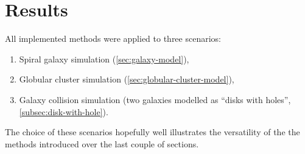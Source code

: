 \chapter{Results}
All implemented methods were applied to three scenarios:
\begin{enumerate}
    \item Spiral galaxy simulation (\autoref{sec:galaxy-model}),
    \item Globular cluster simulation (\autoref{sec:globular-cluster-model}),
    \item Galaxy collision simulation (two galaxies modelled as ``disks with holes'', \autoref{subsec:disk-with-hole}).
\end{enumerate}
The choice of these scenarios hopefully well illustrates the versatility of the the methods introduced over the last couple of sections.







